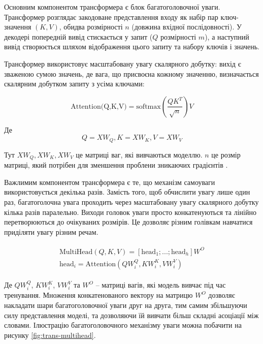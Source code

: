 \documentclass[a4paper,14pt]{extreport}
\begin{document}
Основним компонентом трансформера є блок
багатоголовочної уваги. Трансформер розглядає закодоване
представлення входу як набір пар ключ-значення $(K, V)$,
обидва розмірності $n$ (довжина вхідної послідовності).
У декодері попередній вивід стискається у запит 
($Q$ розмірності $m$), а наступний вивід створюється
шляхом відображення цього запиту та набору ключів і значень.

Трансформер використовує масштабовану увагу
скалярного добутку: вихід є зваженою сумою значень,
де вага, що присвоєна кожному значенню, визначається
скалярним добутком запиту з усіма ключами:

\begin{equation}
    \text{Attention(Q,K,V)} = \text{softmax}(\frac{QK^T}{\sqrt{n}})V
\end{equation}

Де
\begin{equation}
    Q=XW_Q, K=XW_K, V=XW_V
\end{equation}

Тут $XW_Q, XW_K, XW_V$ це матриці ваг, які вивчаються
моделлю. $n$ це розмір матриці, який потрібен
для зменшення проблени зникаючих градієнтів \cite{attention-all-need}.

Важлимим компонентом трансформера є те, що
механізм самоуваги використовується декілька разів.
Замість того, щоб обчислити увагу лише один раз,
багатоголочна увага проходить через масштабовану увагу
скалярного добутку кілька разів паралельно. Виходи головок
уваги просто конкатенуються та лінійно перетворюються
до очікуваних розмірів. Це дозволяє різним голівкам
навчатися приділяти увагу різним речам.

\begin{gather}
\begin{aligned}
    \text{MultiHead}(Q,K,V)= [\text{head}_1; ...; \text{head}_h]W^O \\
    \text{head}_i = \text{Attention}(QW^Q_i, KW^K_i, VW^V_i)
\end{aligned}
\end{gather}

Де $QW^Q_i$, $KW^K_i$, $VW^V_i$ та $W^O$ -- матриці вагів,
які модель вивчає під час тренування.
Множення конкатенованого вектору на матрицю $W^O$
дозволяє накладати шари багатоголовочної уваги друг на друга,
тим самим збільшуючи силу представлення моделі, та дозволяючи
їй вивчати більш складні асоціації між словами.
Ілюстрацію багатоголовочного механізму уваги можна
побачити на рисунку \ref{fig:trans-multihead}.
\end{document}

